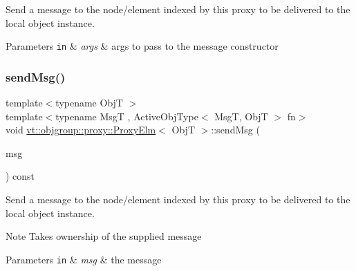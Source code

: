 Send a message to the node/element indexed by this proxy to be delivered to the local object instance. 


\begin{DoxyParams}[1]{Parameters}
\mbox{\tt in}  & {\em args} & args to pass to the message constructor \\
\hline
\end{DoxyParams}
\mbox{\label{structvt_1_1objgroup_1_1proxy_1_1_proxy_elm_a5aca5ec4089c1c7cc2aeb3d010f247fe}} 
\subsubsection{\texorpdfstring{send\+Msg()}{sendMsg()}}
{\footnotesize\ttfamily template$<$typename ObjT $>$ \\
template$<$typename MsgT , Active\+Obj\+Type$<$ Msg\+T, Obj\+T $>$ fn$>$ \\
void \hyperlink{structvt_1_1objgroup_1_1proxy_1_1_proxy_elm}{vt\+::objgroup\+::proxy\+::\+Proxy\+Elm}$<$ ObjT $>$\+::send\+Msg (\begin{DoxyParamCaption}\item[{\hyperlink{structvt_1_1messaging_1_1_msg_ptr_thief}{messaging\+::\+Msg\+Ptr\+Thief}$<$ MsgT $>$}]{msg }\end{DoxyParamCaption}) const}



Send a message to the node/element indexed by this proxy to be delivered to the local object instance. 

\begin{DoxyNote}{Note}
Takes ownership of the supplied message
\end{DoxyNote}

\begin{DoxyParams}[1]{Parameters}
\mbox{\tt in}  & {\em msg} & the message \\
\hline
\end{DoxyParams}
\mbox{\label{structvt_1_1objgroup_1_1proxy_1_1_proxy_elm_aa2c6be8bfa1113516cd6e8b3d7bd0445}} 
